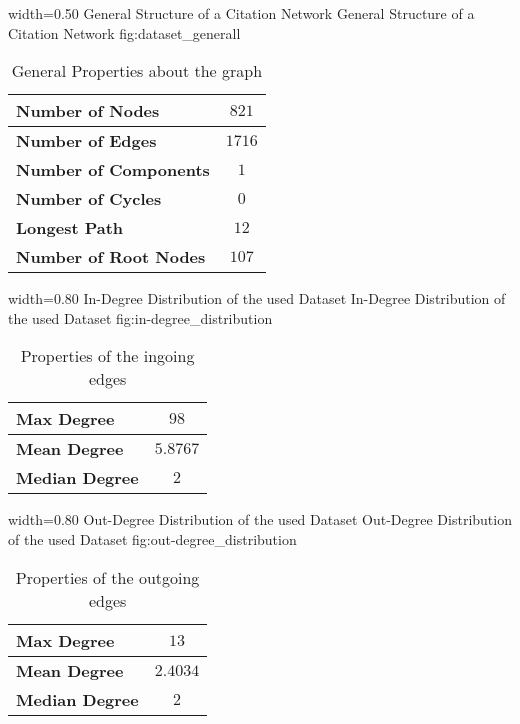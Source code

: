       {width=0.50\textwidth}
      {General Structure of a Citation Network}
      {General Structure of a Citation Network}
      {fig:dataset_generall}

\begin{table}
  \centering
  \begin{tabular}{ l c }
    \toprule
    \textbf{Number of Nodes}      & $821$  \\ \midrule
    \textbf{Number of Edges}      & $1716$ \\ \midrule
    \textbf{Number of Components} & $1$    \\ \midrule
    \textbf{Number of Cycles}     & $0$    \\ \midrule
    \textbf{Longest Path}         & $12$   \\ \midrule
    \textbf{Number of Root Nodes} & $107$  \\
    \bottomrule
  \end{tabular}
  \caption[General Properties about the graph in the used dataset]{General Properties about the graph}
  \label{tbl:general_properties_about_the_graph}
\end{table}


      {width=0.80\textwidth}
      {In-Degree Distribution of the used Dataset}
      {In-Degree Distribution of the used Dataset}
      {fig:in-degree_distribution}

\begin{table}
  \centering
  \begin{tabular}{ l c }
    \toprule
    \textbf{Max Degree}    & $98$     \\ \midrule
    \textbf{Mean Degree}   & $5.8767$ \\ \midrule
    \textbf{Median Degree} & $2$      \\
    \bottomrule
  \end{tabular}
  \caption[Properties of the ingoing edges in the used dataset]{Properties of the ingoing edges}
  \label{tbl:properties_ingoing_edges}
\end{table}

      {width=0.80\textwidth}
      {Out-Degree Distribution of the used Dataset}
      {Out-Degree Distribution of the used Dataset}
      {fig:out-degree_distribution}

\begin{table}
  \centering
  \begin{tabular}{ l c }
    \toprule
    \textbf{Max Degree}    & $13$     \\ \midrule
    \textbf{Mean Degree}   & $2.4034$ \\ \midrule
    \textbf{Median Degree} & $2$      \\
    \bottomrule
  \end{tabular}
  \caption[Properties of the outgoing edges in the used dataset]{Properties of the outgoing edges}
  \label{tbl:properties_outgoing_edges}
\end{table}

